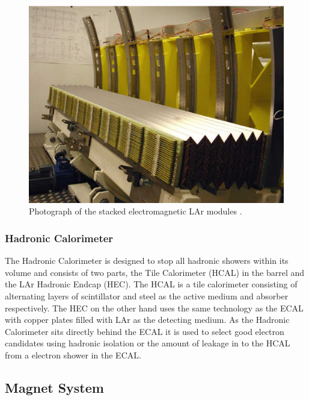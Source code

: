 		\begin{figure}[h!]
			\begin{center}
				\includegraphics[width=0.95\linewidth]{images/LARG3-fig02-module00.eps}
			\end{center}
			\caption{Photograph of the stacked electromagnetic LAr modules \cite{Aad:1129811}.}
			\label{fig:ATLAS_calo_crack}
		\end{figure}


		\subsubsection*{Hadronic Calorimeter}

		The Hadronic Calorimeter is designed to stop all hadronic showers within its volume and consists of two parts, the Tile Calorimeter (HCAL) in the barrel and the LAr Hadronic Endcap (HEC). The HCAL is a tile calorimeter consisting of alternating layers of scintillator and steel as the active medium and absorber respectively. The HEC on the other hand uses the same technology as the ECAL with copper plates filled with LAr as the detecting medium. As the Hadronic Calorimeter sits directly behind the ECAL it is used to select good electron candidates using hadronic isolation or the amount of leakage in to the HCAL from a electron shower in the ECAL.
		


	\subsection{Magnet System}

